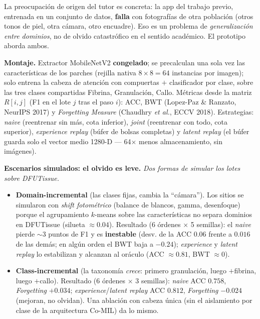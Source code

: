 \documentclass[12pt,letterpaper]{report}
\newcommand{\entrada}[2]{%
    \vspace{0.6em}
    \noindent\textbf{#1.} \textit{#2}
    \vspace{0.3em}
    \par
}
\begin{document}
La preocupación de origen del tutor es concreta: la app del trabajo previo, entrenada en un conjunto
de datos, \textbf{falla} con fotografías de otra población (otros tonos de piel, otra cámara, otro
encuadre). Eso es un problema de \emph{generalización entre dominios}, no de olvido catastrófico en el
sentido académico. El prototipo aborda ambos.

\textbf{Montaje.} Extractor MobileNetV2 \textbf{congelado}; se precalculan una sola vez las
características de los parches (rejilla nativa $8\times8 = 64$ instancias por imagen); solo entrena la
cabeza de atención con compuertas $+$ clasificador por clase, sobre las tres clases compartidas
{Fibrina, Granulación, Callo}. Métricas desde la matriz $R[i,j]$ (F1 en el lote $j$ tras el paso
$i$): ACC, BWT (Lopez-Paz \& Ranzato, NeurIPS 2017) y \emph{Forgetting Measure} (Chaudhry \emph{et
al.}, ECCV 2018). Estrategias: \emph{naive} (reentrenar sin más, cota inferior), \emph{joint}
(reentrenar con todo, cota superior), \emph{experience replay} (búfer de bolsas completas) y
\emph{latent replay} (el búfer guarda solo el vector medio 1280-D --- 64$\times$ menos
almacenamiento, sin imágenes).

\entrada{Escenarios simulados: el olvido es leve}{Dos formas de simular los lotes sobre DFUTissue.}

\begin{itemize}[leftmargin=1.5em]
    \item \textbf{Domain-incremental} (las clases fijas, cambia la ``cámara''). Los sitios se
        simularon con \emph{shift fotométrico} (balance de blancos, gamma, desenfoque) porque el
        agrupamiento $k$-means sobre las características no separa dominios en DFUTissue (silueta
        $\approx 0.04$). Resultado (6 órdenes $\times$ 5 semillas): el \emph{naive} pierde
        $\sim$3 puntos de F1 y es \textbf{inestable} (desv. de la ACC $0.06$ frente a $0.016$ de las
        demás; en algún orden el BWT baja a $-0.24$); \emph{experience} y \emph{latent replay} lo
        estabilizan y alcanzan al oráculo (ACC $\approx 0.81$, BWT $\approx 0$).
    \item \textbf{Class-incremental} (la taxonomía \emph{crece}: primero granulación, luego $+$fibrina,
        luego $+$callo). Resultado (6 órdenes $\times$ 3 semillas): \emph{naive} ACC $0.758$,
        \emph{Forgetting} $+0.034$; \emph{experience}/\emph{latent replay} ACC $0.812$,
        \emph{Forgetting} $-0.024$ (mejoran, no olvidan). Una ablación con cabeza única (sin el
        aislamiento por clase de la arquitectura Co-MIL) da lo mismo.
\end{itemize}
\end{document}
